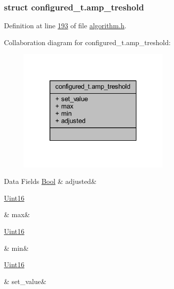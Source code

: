 \subsubsection{struct configured\+\_\+t.\+amp\+\_\+treshold}


Definition at line \hyperlink{a00021_source_l00193}{193} of file \hyperlink{a00021_source}{algorithm.\+h}.



Collaboration diagram for configured\+\_\+t.\+amp\+\_\+treshold\+:\nopagebreak
\begin{figure}[H]
\begin{center}
\leavevmode
\includegraphics[width=211pt]{d7/d34/a00883}
\end{center}
\end{figure}
\begin{DoxyFields}{Data Fields}
\hypertarget{a00021_adfee99127eb2eadbb3f1912f2e8e676a}{\hyperlink{a00072_a253b248072cfc8bd812c69acd0046eed}{Bool}}\label{a00021_adfee99127eb2eadbb3f1912f2e8e676a}
&
adjusted&
\\
\hline

\hypertarget{a00021_a2ffe4e77325d9a7152f7086ea7aa5114}{\hyperlink{a00072_a59a9f6be4562c327cbfb4f7e8e18f08b}{Uint16}}\label{a00021_a2ffe4e77325d9a7152f7086ea7aa5114}
&
max&
\\
\hline

\hypertarget{a00021_ad8bd79cc131920d5de426f914d17405a}{\hyperlink{a00072_a59a9f6be4562c327cbfb4f7e8e18f08b}{Uint16}}\label{a00021_ad8bd79cc131920d5de426f914d17405a}
&
min&
\\
\hline

\hypertarget{a00021_a104827712279d9ce937fb0c4f46766b1}{\hyperlink{a00072_a59a9f6be4562c327cbfb4f7e8e18f08b}{Uint16}}\label{a00021_a104827712279d9ce937fb0c4f46766b1}
&
set\+\_\+value&
\\
\hline

\end{DoxyFields}
\label{dd/d63/a00455}
\hypertarget{a00021_dd/d63/a00455}{}
